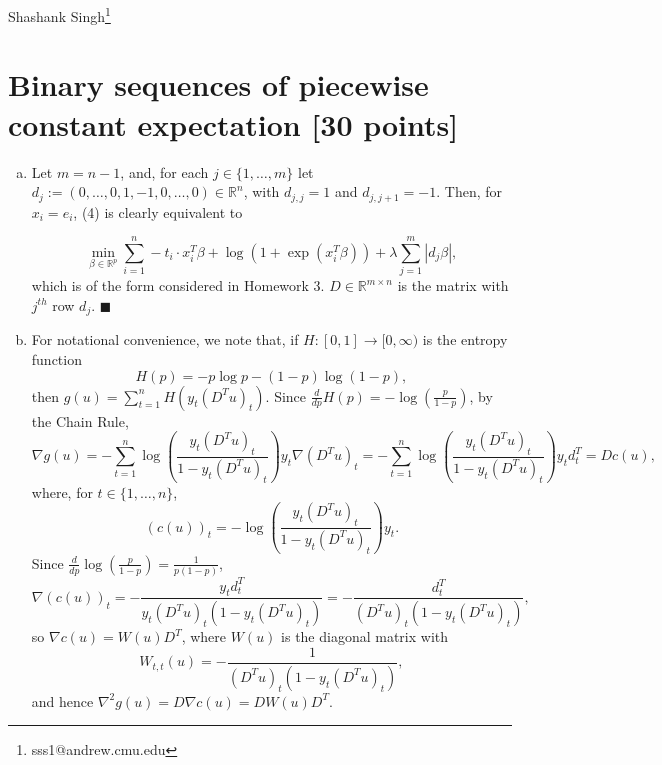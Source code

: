 \documentclass[11pt]{article}
\newcommand{\R}{\mathbb{R}}
\renewcommand{\qed}{\quad \ensuremath{\blacksquare}}
\begin{document}
Shashank Singh\footnote{sss1@andrew.cmu.edu}
\setcounter{section}{2}
\section{Binary sequences of piecewise constant expectation [30 points]}
\begin{enumerate}[(a)]
\item Let $m = n - 1$, and, for each $j \in \{1,\dots,m\}$ let
$d_j := (0,\dots,0,1,-1,0,\dots,0) \in \R^n$, with $d_{j,j} = 1$ and
$d_{j,j + 1} = -1$. Then, for $x_i = e_i$, (4) is clearly equivalent to

\[\min_{\beta \in \R^p} \sum_{i = 1}^n - t_i \cdot x_i^T\beta
    + \log\left(1 + \exp(x_i^T\beta) \right)
    + \lambda \sum_{j = 1}^m |d_j\beta|,
\]
which is of the form considered in Homework 3. $D \in \R^{m \times n}$ is the
matrix with $j^{th}$ row $d_j$. \qed

\item For notational convenience, we note that, if $H : [0,1] \to [0,\infty)$
is the entropy function
\[H(p) = -p\log p - (1 - p)\log(1 - p),\]
then $\displaystyle g(u) = \sum_{t = 1}^n H(y_t(D^Tu)_t)$. Since
$\displaystyle \frac{d}{dp} H(p) = -\log\left( \frac{p}{1 - p} \right)$, by the
Chain Rule,
\[ \nabla g(u)
    = -\sum_{t = 1}^n \log\left( \frac{y_t(D^Tu)_t}{1 - y_t(D^Tu)_t} \right)
        y_t \nabla (D^Tu)_t
    = -\sum_{t = 1}^n \log\left( \frac{y_t(D^Tu)_t}{1 - y_t(D^Tu)_t} \right)
        y_t d_t^T
    = Dc(u),
\]
where, for $t \in \{1,\dots,n\}$,
\[(c(u))_t
    = - \log\left( \frac{y_t(D^Tu)_t}{1 - y_t(D^Tu)_t} \right) y_t.
\]
Since $\displaystyle \frac{d}{dp} \log \left( \frac{p}{1 - p} \right)
    = \frac{1}{p(1 - p)}$,
\[\nabla(c(u))_t
    = -\frac{y_td_t^T}{y_t(D^Tu)_t(1 - y_t(D^Tu)_t)}
    = -\frac{d_t^T}{(D^Tu)_t(1 - y_t(D^Tu)_t)},
\]
so $\nabla c(u) = W(u)D^T$, where $W(u)$ is the diagonal matrix with
\[W_{t,t}(u) = -\frac{1}{(D^Tu)_t(1 - y_t(D^Tu)_t)},\]
and hence $\nabla^2 g(u) = D\nabla c(u) = DW(u)D^T$.


\end{enumerate}
\end{document}
